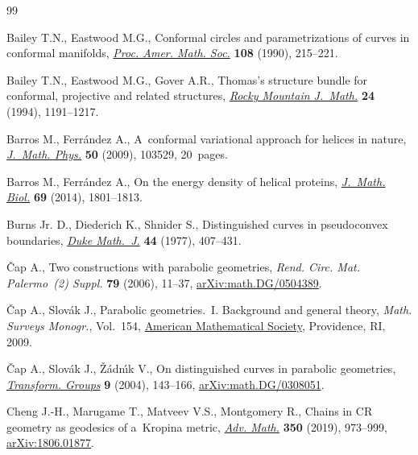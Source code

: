 \documentclass[pdftex]{sigma}
\numberwithin{equation}{section}
\begin{document}
\begin{thebibliography}{99}
\footnotesize\itemsep=0pt

Bailey T.N., Eastwood M.G., Conformal circles and parametrizations of curves in
 conformal manifolds, \href{https://doi.org/10.2307/2047716}{\textit{Proc.
 Amer. Math. Soc.}} \textbf{108} (1990), 215--221.

Bailey T.N., Eastwood M.G., Gover A.R., Thomas's structure bundle for
 conformal, projective and related structures,
 \href{https://doi.org/10.1216/rmjm/1181072333}{\textit{Rocky Mountain
 J.~Math.}} \textbf{24} (1994), 1191--1217.

Barros M., Ferr\'andez A., A~conformal variational approach for helices in
 nature, \href{https://doi.org/10.1063/1.3236683}{\textit{J.~Math. Phys.}}
 \textbf{50} (2009), 103529, 20~pages.

Barros M., Ferr\'andez A., On the energy density of helical proteins,
 \href{https://doi.org/10.1007/s00285-013-0752-9}{\textit{J.~Math. Biol.}}
 \textbf{69} (2014), 1801--1813.

Burns Jr. D., Diederich K., Shnider S., Distinguished curves in pseudoconvex
 boundaries, \href{https://doi.org/10.1215/S0012-7094-77-04419-2}{\textit{Duke
 Math.~J.}} \textbf{44} (1977), 407--431.

{\v{C}}ap A., Two constructions with parabolic geometries, \textit{Rend. Circ.
 Mat. Palermo~(2) Suppl.} \textbf{79} (2006), 11--37,
 \href{http://arxiv.org/abs/math.DG/0504389}{arXiv:math.DG/0504389}.

{\v{C}}ap A., Slov\'ak J., Parabolic geometries.~{I}. {B}ackground and general
 theory, \textit{Math. Surveys Monogr.}, Vol.~154,
 \href{https://doi.org/10.1090/surv/154}{American Mathematical Society},
 Providence, RI, 2009.

{\v{C}}ap A., Slov\'ak J., {\v{Z}}\'adn\'{\i}k V., On distinguished curves in
 parabolic geometries,
 \href{https://doi.org/10.1007/s00031-004-7009-z}{\textit{Transform. Groups}}
 \textbf{9} (2004), 143--166,
 \href{http://arxiv.org/abs/math.DG/0308051}{arXiv:math.DG/0308051}.

Cheng J.-H., Marugame T., Matveev V.S., Montgomery R., Chains in {CR} geometry
 as geodesics of a~{K}ropina metric,
 \href{https://doi.org/10.1016/j.aim.2019.05.004}{\textit{Adv. Math.}}
 \textbf{350} (2019), 973--999,
 \href{http://arxiv.org/abs/1806.01877}{arXiv:1806.01877}.


\end{thebibliography}
\end{document}
